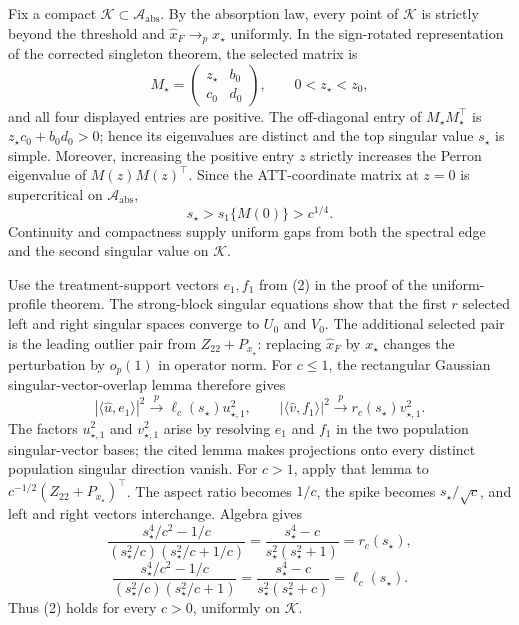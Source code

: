 Fix a compact \(\mathcal K\subset\mathcal A_{\mathrm{abs}}\).  By the absorption law, every point of \(\mathcal K\) is strictly beyond the threshold and \(\widehat x_F\to_p x_\star\) uniformly.  In the sign-rotated representation of the corrected singleton theorem, the selected matrix is
\[
 M_\star=\begin{pmatrix}z_\star&b_0\\c_0&d_0\end{pmatrix},
 \qquad 0<z_\star<z_0,
\]
and all four displayed entries are positive.  The off-diagonal entry of \(M_\star M_\star^{\top}\) is \(z_\star c_0+b_0d_0>0\); hence its eigenvalues are distinct and the top singular value \(s_\star\) is simple.  Moreover, increasing the positive entry \(z\) strictly increases the Perron eigenvalue of \(M(z)M(z)^{\top}\).  Since the ATT-coordinate matrix at \(z=0\) is supercritical on \(\mathcal A_{\mathrm{abs}}\),
\[
 s_\star>s_1\{M(0)\}>c^{1/4}. \tag{1}
\]
Continuity and compactness supply uniform gaps from both the spectral edge and the second singular value on \(\mathcal K\).

Use the treatment-support vectors \(e_1,f_1\) from (2) in the proof of the uniform-profile theorem.  The strong-block singular equations show that the first \(r\) selected left and right singular spaces converge to \(U_0\) and \(V_0\).  The additional selected pair is the leading outlier pair from \(Z_{22}+P_{x_\star}\): replacing \(\widehat x_F\) by \(x_\star\) changes the perturbation by \(o_p(1)\) in operator norm.  For \(c\leq1\), the rectangular Gaussian singular-vector-overlap lemma therefore gives
\[
 |\langle\widehat u,e_1\rangle|^2
 \xrightarrow{p}\ell_c(s_\star)u_{\star,1}^2,
 \qquad
 |\langle\widehat v,f_1\rangle|^2
 \xrightarrow{p}r_c(s_\star)v_{\star,1}^2. \tag{2}
\]
The factors \(u_{\star,1}^2\) and \(v_{\star,1}^2\) arise by resolving \(e_1\) and \(f_1\) in the two population singular-vector bases; the cited lemma makes projections onto every distinct population singular direction vanish.  For \(c>1\), apply that lemma to \(c^{-1/2}(Z_{22}+P_{x_\star})^{\top}\).  The aspect ratio becomes \(1/c\), the spike becomes \(s_\star/\sqrt c\), and left and right vectors interchange.  Algebra gives
\[
 \frac{s_\star^4/c^2-1/c}{(s_\star^2/c)(s_\star^2/c+1/c)}
 =\frac{s_\star^4-c}{s_\star^2(s_\star^2+1)}=r_c(s_\star),
\]
\[
 \frac{s_\star^4/c^2-1/c}{(s_\star^2/c)(s_\star^2/c+1)}
 =\frac{s_\star^4-c}{s_\star^2(s_\star^2+c)}=\ell_c(s_\star). \tag{3}
\]
Thus (2) holds for every \(c>0\), uniformly on \(\mathcal K\).

